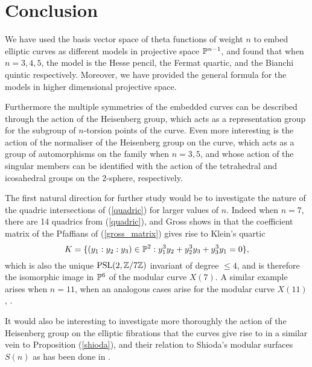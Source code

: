 \section{Conclusion}

We have used the basis vector space of theta functions of weight $n$ to embed elliptic curves as different models in projective space $\mathbb{P}^{n-1}$, and found that when $n = 3, 4, 5$, the model is the Hesse pencil, the Fermat quartic, and the Bianchi quintic respectively. Moreover, we have provided the general formula for the models in higher dimensional projective space.

Furthermore the multiple symmetries of the embedded curves can be described through the action of the Heisenberg group, which acts as a representation group for the subgroup of $n$-torsion points of the curve. Even more interesting is the action of the normaliser of the Heisenberg group on the curve, which acts as a group of automorphisms on the family when $n = 3, 5$, and whose action of the singular members can be identified with the action of the tetrahedral and icosahedral groups on the 2-sphere, respectively.

The first natural direction for further study would be to investigate the nature of the quadric intersections of (\ref{quadric}) for larger values of $n$. Indeed when $n = 7$, there are 14 quadrics from (\ref{quadric}), and  Gross shows in \cite{Gross_1996} that the coefficient matrix of the Pfaffians of (\ref{gross_matrix}) gives rise to Klein's quartic
\begin{equation*}
	K = \{ (y_{1}:y_{2}:y_{3}) \in \mathbb{P}^{2} : y_{1}^{3}y_{2} + y_{2}^{3}y_{3} + y_{3}^{3}y_{1} = 0\},
\end{equation*}
which is also the unique $\operatorname{PSL}(2,\mathbb{Z}/7\mathbb{Z})$ invariant of degree $\leq 4$, and is therefore the isomorphic image in $\mathbb{P}^{6}$ of the modular curve $X(7)$. A similar example arises when $n = 11$, when an analogous cases arise for the modular curve $X(11)$, \cite{Gross_1996}.

It would also be interesting to investigate more thoroughly the action of the Heisenberg group on the elliptic fibrations that the curves give rise to in a similar vein to Proposition (\ref{shioda}), and their relation to Shioda's modular surfaces $S(n)$ as has been done in \cite{Barth_1985}.
